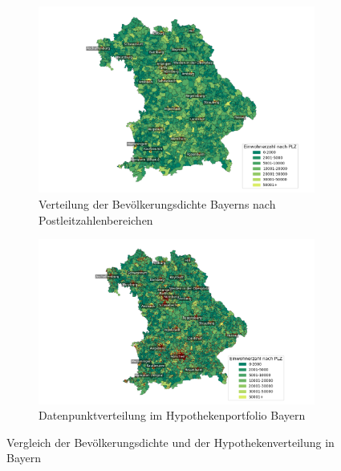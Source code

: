 \begin{figure}[htbp]
    \centering
    \begin{subfigure}{\textwidth}
        \centering
        \includegraphics[width=\textwidth]{figures/Bayern_pop_plz.png}
        \caption{Verteilung der Bevölkerungsdichte Bayerns nach Postleitzahlenbereichen}
        \label{fig:bevoelkerungsdichte}
    \end{subfigure}

    \vspace{0.5cm} %

    \begin{subfigure}{\textwidth}
        \centering
        \includegraphics[width=\textwidth]{figures/bayen_por_pop.png}
        \caption{Datenpunktverteilung im Hypothekenportfolio Bayern}
        \label{fig:hypothekenportfolio}
    \end{subfigure}
    \caption{Vergleich der Bevölkerungsdichte und der Hypothekenverteilung in Bayern}
    \label{fig:vergleich_bayern}
\end{figure}
\clearpage